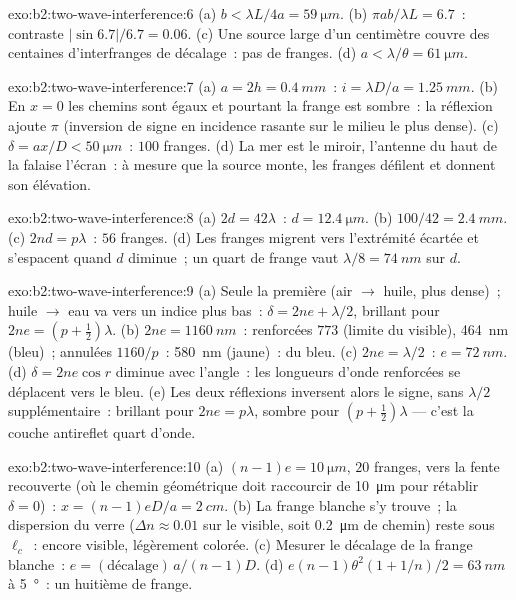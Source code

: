 \begin{solution}{exo:b2:two-wave-interference:6}
(a) $b < \lambda L/4a = \qty{59}{\micro m}$. (b) $\pi ab/\lambda L = 6.7$~: contraste $|\sin6.7|/6.7
= 0.06$. (c) Une source large d'un centimètre couvre des centaines d'interfranges de
décalage~: pas de franges. (d) $a < \lambda/\theta = \qty{61}{\micro m}$.
\end{solution}

\begin{solution}{exo:b2:two-wave-interference:7}
(a) $a = 2h = \qty{0.4}{mm}$~: $i = \lambda D/a = \qty{1.25}{mm}$. (b) En $x = 0$ les chemins
sont égaux et pourtant la frange est sombre~: la réflexion ajoute $\pi$ (inversion
de signe en incidence rasante sur le milieu le plus dense). (c) $\delta = ax/D <
\qty{50}{\micro m}$~: $100$ franges. (d) La mer est le miroir, l'antenne du haut de
la falaise l'écran~: à mesure que la source monte, les franges défilent et
donnent son élévation.
\end{solution}

\begin{solution}{exo:b2:two-wave-interference:8}
(a) $2d = 42\lambda$~: $d = \qty{12.4}{\micro m}$. (b) $100/42 = \qty{2.4}{mm}$. (c) $2nd = p\lambda$~:
$56$ franges. (d) Les franges migrent vers l'extrémité écartée et s'espacent quand $d$
diminue~; un quart de frange vaut $\lambda/8 = \qty{74}{nm}$ sur $d$.
\end{solution}

\begin{solution}{exo:b2:two-wave-interference:9}
(a) Seule la première (air $\to$ huile, plus dense)~; huile $\to$ eau va vers un indice
plus bas~: $\delta = 2ne + \lambda/2$, brillant pour $2ne = (p + \tfrac12)\lambda$. (b) $2ne =
\qty{1160}{nm}$~: renforcées $773$ (limite du visible), \qty{464}{nm} (bleu)~;
annulées $1160/p$~: \qty{580}{nm} (jaune)~: du bleu. (c) $2ne = \lambda/2$~: $e = \qty{72}{nm}$.
(d) $\delta = 2ne\cos r$ diminue avec l'angle~: les longueurs d'onde renforcées
se déplacent vers le bleu. (e) Les deux réflexions inversent alors le signe, sans
$\lambda/2$ supplémentaire~: brillant pour $2ne = p\lambda$, sombre pour $(p + \tfrac12)\lambda$ --- c'est la
couche antireflet quart d'onde.
\end{solution}

\begin{solution}{exo:b2:two-wave-interference:10}
(a) $(n - 1)e = \qty{10}{\micro m}$, $20$ franges, vers la fente recouverte (où
le chemin géométrique doit raccourcir de \qty{10}{\micro m} pour rétablir $\delta = 0$)~:
$x = (n - 1)eD/a = \qty{2}{cm}$. (b) La frange blanche s'y trouve~; la dispersion du verre
($\Delta n \approx 0.01$ sur le visible, soit \qty{0.2}{\micro m} de chemin)
reste sous $\ell_c$~: encore visible, légèrement colorée. (c) Mesurer le
décalage de la frange blanche~: $e = (\text{décalage})\,a/(n - 1)D$. (d) $e(n - 1)\theta^2
(1 + 1/n)/2 = \qty{63}{nm}$ à \qty{5}{\degree}~: un huitième de frange.
\end{solution}

